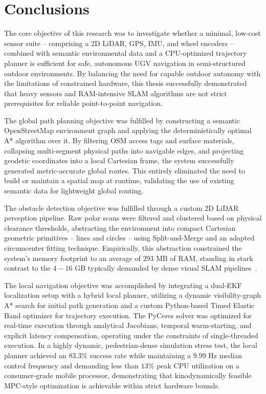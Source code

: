 
\chapter{Conclusions}
\label{chap:conclusion}

The core objective of this research was to investigate whether a minimal, low-cost sensor suite -- comprising a 2D LiDAR, GPS, IMU, and wheel encoders -- combined with semantic environmental data and a CPU-optimized trajectory planner is sufficient for safe, autonomous UGV navigation in semi-structured outdoor environments. By balancing the need for capable outdoor autonomy with the limitations of constrained hardware, this thesis successfully demonstrated that heavy sensors and RAM-intensive SLAM algorithms are not strict prerequisites for reliable point-to-point navigation.

The global path planning objective was fulfilled by constructing a semantic OpenStreetMap environment graph and applying the deterministically optimal A* algorithm over it. By filtering OSM access tags and surface materials, collapsing multi-segment physical paths into navigable edges, and projecting geodetic coordinates into a local Cartesian frame, the system successfully generated metric-accurate global routes. This entirely eliminated the need to build or maintain a spatial map at runtime, validating the use of existing semantic data for lightweight global routing.

The obstacle detection objective was fulfilled through a custom 2D LiDAR perception pipeline. Raw polar scans were filtered and clustered based on physical clearance thresholds, abstracting the environment into compact Cartesian geometric primitives -- lines and circles -- using Split-and-Merge and an adapted circumcenter fitting technique. Empirically, this abstraction constrained the system's memory footprint to an average of $293\text{ MB}$ of RAM, standing in stark contrast to the $4-16\text{ GB}$ typically demanded by dense visual SLAM pipelines~\cite{schmidt2025vislam}.

The local navigation objective was accomplished by integrating a dual-EKF localization setup with a hybrid local planner, utilizing a dynamic visibility-graph A* search for initial path generation and a custom Python-based Timed Elastic Band optimizer for trajectory execution. The PyCeres solver was optimized for real-time execution through analytical Jacobians, temporal warm-starting, and explicit latency compensation, operating under the constraints of single-threaded execution. In a highly dynamic, pedestrian-dense simulation stress test, the local planner achieved an $83.3\%$ success rate while maintaining a $9.99\text{ Hz}$ median control frequency and demanding less than $13\%$ peak CPU utilization on a consumer-grade mobile processor, demonstrating that kinodynamically feasible MPC-style optimization is achievable within strict hardware bounds.

